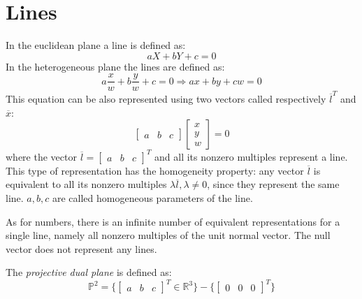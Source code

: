 \documentclass[12pt, a4paper]{report}
\newtheorem[style=M,bodystyle=\normalfont]{theorem}{Theorem}
\newtheorem[style=M,bodystyle=\normalfont]{corollary}{Corollary}
\newtheorem[style=M,bodystyle=\normalfont]{lemma}{Lemma}
\newtheorem[style=M,bodystyle=\normalfont]{definition}{Definition}
\begin{document}
    \section{Lines}
    In the euclidean plane a line is defined as: 
    \[aX+bY+c=0\]
    In the heterogeneous plane the lines are defined as: 
    \[a\dfrac{x}{w}+b \dfrac{y}{w}+c=0 \Longrightarrow ax+by+cw=0\]
    This equation can be also represented using two vectors called respectively $\overline{l}^T$ and $\overline{x}$:
    \[\begin{bmatrix} a & b & c \end{bmatrix} \begin{bmatrix} x \\ y \\ w \end{bmatrix}=0\]
    where the vector $\overline{l}={\begin{bmatrix} a & b & c \end{bmatrix}}^T$ and all its nonzero multiples represent a line. This type of representation has the homogeneity
    property: any vector $\overline{l}$ is equivalent to all its nonzero multiples $\lambda \overline{l}, \lambda \neq 0$, since they represent the same line. $a,b,c$ are called 
    homogeneous parameters of the line. 

    As for numbers, there is an infinite number of equivalent representations for a single line, namely all nonzero multiples of the unit normal vector. The null vector does not
    represent any lines.
    \begin{definition}
        The \emph{projective dual plane} is defined as: 
        \[\mathbb{P}^2=\{{\begin{bmatrix} a & b & c \end{bmatrix}}^T \in \mathbb{R}^3\}-\{{\begin{bmatrix} 0 & 0 & 0 \end{bmatrix}}^T\}\]
    \end{definition}
\end{document}
